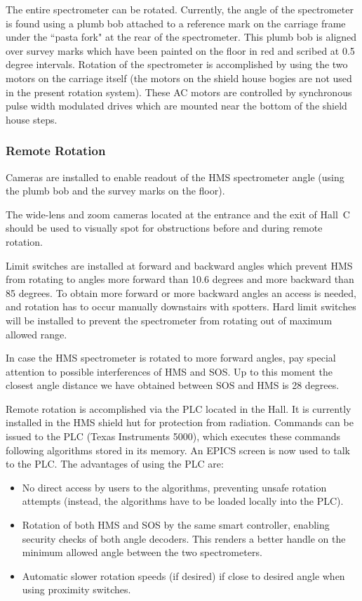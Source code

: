The entire spectrometer can be rotated. Currently, the angle of the spectrometer
is found using a plumb bob attached to a reference mark on the
carriage frame under the ``pasta fork" at the rear of the spectrometer.
This plumb bob is aligned over survey marks which have been painted
on the floor in red and scribed at 0.5 degree intervals. Rotation of the spectrometer
is accomplished by using the two motors on the carriage itself (the motors on
the shield house bogies are not used in the present rotation system).
These AC motors are controlled by synchronous pulse width modulated
drives which are mounted near the bottom of the shield house steps.

\subsubsection{Remote Rotation}

Cameras are installed to enable readout of the HMS spectrometer angle
(using the plumb bob and the survey marks on the floor).

The wide-lens and zoom cameras located at the entrance and
the exit of Hall~C should be used to visually spot for obstructions
before and during remote rotation.

Limit switches are installed at forward
and backward angles which prevent HMS from rotating to angles more forward than
10.6 degrees and more backward than 85 degrees. To obtain more forward or more
backward angles an access is needed, and rotation has to occur manually
downstairs with spotters. Hard limit switches will be installed to prevent
the spectrometer from rotating out of maximum allowed range.

In case the HMS spectrometer is rotated to more forward angles, pay special
attention to possible interferences of HMS and SOS. Up to this moment
the closest  angle distance we have obtained between SOS and HMS is 28 degrees.

Remote rotation  is accomplished via the PLC located in the Hall.  It
is currently installed in the HMS shield hut for protection from
radiation.  Commands can be issued to the PLC (Texas Instruments 5000), which executes these commands
following algorithms stored in its memory. An EPICS screen is now
used to talk to the PLC.  The advantages of using the PLC are:

\begin{itemize}
\item{No direct access by users to the algorithms, preventing unsafe
rotation attempts (instead, the algorithms have to be loaded locally into
the PLC).}
\item{Rotation of both HMS and SOS by the same smart controller, enabling
security checks of both angle decoders. This renders a better handle on the
minimum allowed angle between the two spectrometers.}
\item{Automatic slower rotation speeds (if desired) if close to desired angle
when using proximity switches.}
\end{itemize}

